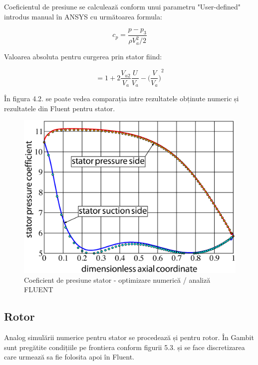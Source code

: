 Coeficientul de presiune se calculează conform unui parametru "User-defined" introdus manual în ANSYS cu următoarea formula:

\begin{equation}
c_p = \frac{p-p_3}{\rho V_a^2 / 2}
\end{equation}

Valoarea absoluta pentru curgerea prin stator fiind:

\begin{equation}
= 1 + 2 \frac{V_{u2}}{V_a} \frac{U}{V_a} - {\Big(\frac{V}{V_a}\Big)}^2
\end{equation}

În figura 4.2. se poate vedea comparația intre rezultatele obținute numeric și rezultatele din Fluent pentru stator.

\begin{figure}[h]
	\centering
	\includegraphics[scale=0.4]{figures/cp-stator-ezdraw.eps}
	\caption{Coeficient de presiune stator - optimizare numerică / analiză FLUENT}
	\label{Coeficient de presiune stator - optimizare numerică / analiză FLUENT}
\end{figure}

\clearpage

\subsection{Rotor}

Analog simulării numerice pentru stator se procedează și pentru rotor. În Gambit sunt pregătite condițiile pe frontiera conform figurii 5.3. și se face discretizarea care urmează sa fie folosita apoi în Fluent.

